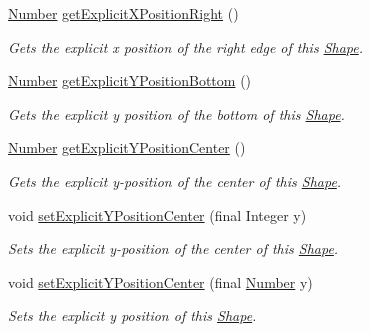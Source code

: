 \begin{DoxyCompactItemize}
\hyperlink{interfacecom_1_1aarrelaakso_1_1drawl_1_1_number}{Number} \hyperlink{classcom_1_1aarrelaakso_1_1drawl_1_1_shape_a86920ba43a76d5a02977e5f9ea3509ac}{get\+Explicit\+X\+Position\+Right} ()
\begin{DoxyCompactList}\small\item\em Gets the explicit x position of the right edge of this \hyperlink{classcom_1_1aarrelaakso_1_1drawl_1_1_shape}{Shape}. \end{DoxyCompactList}\item 
\hyperlink{interfacecom_1_1aarrelaakso_1_1drawl_1_1_number}{Number} \hyperlink{classcom_1_1aarrelaakso_1_1drawl_1_1_shape_a28b8e03381be6afdc7c5c8da48c80afe}{get\+Explicit\+Y\+Position\+Bottom} ()
\begin{DoxyCompactList}\small\item\em Gets the explicit y position of the bottom of this \hyperlink{classcom_1_1aarrelaakso_1_1drawl_1_1_shape}{Shape}. \end{DoxyCompactList}\item 
\hyperlink{interfacecom_1_1aarrelaakso_1_1drawl_1_1_number}{Number} \hyperlink{classcom_1_1aarrelaakso_1_1drawl_1_1_shape_a1e46cc626d5f5e1360d9d35d23cc50ea}{get\+Explicit\+Y\+Position\+Center} ()
\begin{DoxyCompactList}\small\item\em Gets the explicit y-\/position of the center of this \hyperlink{classcom_1_1aarrelaakso_1_1drawl_1_1_shape}{Shape}. \end{DoxyCompactList}\item 
void \hyperlink{classcom_1_1aarrelaakso_1_1drawl_1_1_shape_a93e9e1bdd05f111661660e9de621cd12}{set\+Explicit\+Y\+Position\+Center} (final Integer y)
\begin{DoxyCompactList}\small\item\em Sets the explicit y-\/position of the center of this \hyperlink{classcom_1_1aarrelaakso_1_1drawl_1_1_shape}{Shape}. \end{DoxyCompactList}\item 
void \hyperlink{classcom_1_1aarrelaakso_1_1drawl_1_1_shape_a7d49d69bd74e57c3a3341a025c3cce50}{set\+Explicit\+Y\+Position\+Center} (final \hyperlink{interfacecom_1_1aarrelaakso_1_1drawl_1_1_number}{Number} y)
\begin{DoxyCompactList}\small\item\em Sets the explicit y position of this \hyperlink{classcom_1_1aarrelaakso_1_1drawl_1_1_shape}{Shape}. \end{DoxyCompactList}\item 

\end{DoxyCompactItemize}

